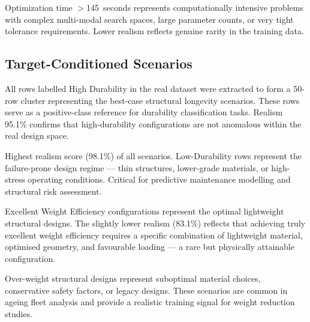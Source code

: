 \documentclass[12pt,a4paper]{article}
\begin{document}
\begin{tcolorbox}[rulebox, title={Long Optimization (Realism 81.3\%)}]
Optimization time $>$145~seconds represents computationally intensive problems with complex multi-modal search spaces, large parameter counts, or very tight tolerance requirements. Lower realism reflects genuine rarity in the training data.
\end{tcolorbox}

\subsection{Target-Conditioned Scenarios}

\begin{tcolorbox}[rulebox, title={High Durability Cluster (Realism 95.1\%)}]
All rows labelled High Durability in the real dataset were extracted to form a 50-row cluster representing the best-case structural longevity scenarios. These rows serve as a positive-class reference for durability classification tasks. Realism 95.1\% confirms that high-durability configurations are not anomalous within the real design space.
\end{tcolorbox}

\begin{tcolorbox}[rulebox, title={Low Durability Cluster (Realism 98.1\%)}]
Highest realism score (98.1\%) of all scenarios. Low-Durability rows represent the failure-prone design regime --- thin structures, lower-grade materials, or high-stress operating conditions. Critical for predictive maintenance modelling and structural risk assessment.
\end{tcolorbox}

\begin{tcolorbox}[rulebox, title={Excellent Weight Efficiency (Realism 83.1\%)}]
Excellent Weight Efficiency configurations represent the optimal lightweight structural designs. The slightly lower realism (83.1\%) reflects that achieving truly excellent weight efficiency requires a specific combination of lightweight material, optimised geometry, and favourable loading --- a rare but physically attainable configuration.
\end{tcolorbox}

\begin{tcolorbox}[rulebox, title={Poor Weight Efficiency (Realism 96.9\%)}]
Over-weight structural designs represent suboptimal material choices, conservative safety factors, or legacy designs. These scenarios are common in ageing fleet analysis and provide a realistic training signal for weight reduction studies.
\end{tcolorbox}
\end{document}
